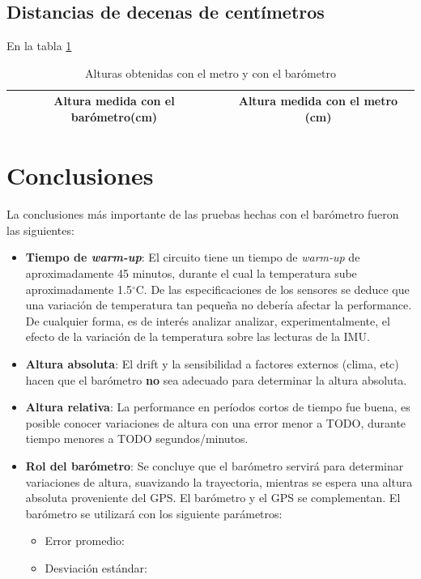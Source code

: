 \documentclass[spanish,12pt,a4paper,titlepage]{report}
\newcommand{\degc}{$^\circ$C}
\begin{document}
\subsection{Distancias de decenas de centímetros}

En la tabla \ref{tab:alturascm}


\begin{table}[H]
\centering
\begin{tabular}{|c|c|} 

	\cellcolor[gray]{0.8} {Altura medida con el barómetro(cm)} &
	\cellcolor[gray]{0.8} Altura medida con el metro (cm) \\ \hline
\end{tabular}
\caption{Alturas obtenidas con el metro y con el barómetro}
\label{tab:alturascm}
\end{table}


\newpage
\section{Conclusiones}
\label{sec:conclusiones}

La conclusiones más importante de las pruebas hechas con el barómetro fueron las siguientes:

\begin{itemize}
\item \textbf{Tiempo de \textit{warm-up}}: El circuito tiene un tiempo de \textit{warm-up} de aproximadamente 45 minutos, durante el cual la temperatura sube aproximadamente 1.5\degc. De las especificaciones de los sensores se deduce que una variación de temperatura tan pequeña no debería afectar la performance. De cualquier forma, es de interés analizar analizar, experimentalmente, el efecto de la variación de la temperatura sobre las lecturas de la IMU.
\item \textbf{Altura absoluta}: El drift y la sensibilidad a factores externos (clima, etc) hacen que el barómetro \textbf{no} sea adecuado para determinar la altura absoluta.
\item \textbf{Altura relativa}: La performance en períodos cortos de tiempo fue buena, es posible conocer variaciones de altura con una error menor a TODO, durante tiempo menores a TODO segundos/minutos.
\item \textbf{Rol del barómetro}: Se concluye que el barómetro servirá para determinar variaciones de altura, suavizando la trayectoria, mientras se espera una altura absoluta proveniente del GPS. El barómetro y el GPS se complementan. El barómetro se utilizará con los siguiente parámetros:
  \begin{itemize}
  \item Error promedio: 
  \item Desviación estándar:
  \end{itemize}
\end{itemize}
\end{document}
